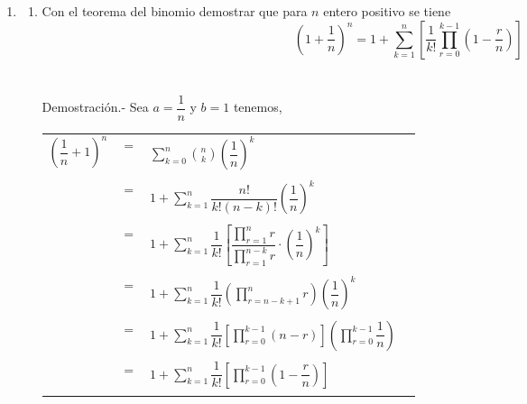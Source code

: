 \begin{enumerate}[ \bfseries 1.]
\item 
\begin{enumerate}[\bfseries (a)]
\item Con el teorema del binomio demostrar que para $n$ entero positivo se tiene 
$$\left( 1 + \dfrac{1}{n}  \right)^n = 1 + \displaystyle\sum_{k=1}^n \left[ \dfrac{1}{k!} \prod_{r=0}^{k-1} \left( 1 - \dfrac{r}{n} \right) \right]$$\\\\
Demostración.- \; Sea $a=\dfrac{1}{n}$ y $b=1$ tenemos,
\begin{center}
\begin{tabular}{rcll}
$\left( \dfrac{1}{n} + 1 \right)^n$&$=$&$\sum\limits_{k=0}^n {n \choose k} \left( \dfrac{1}{n} \right)^k$&\\\\
&$=$&$1 + \sum\limits_{k=1}^n \dfrac{n!}{k!(n-k)!} \left( \dfrac{1}{n} \right)^k$&\\\\
&$=$&$1+ \sum\limits_{k=1}^n \dfrac{1}{k!} \left[ \dfrac{\prod\limits_{r=1}^n r}{\prod\limits_{r=1}^{n-k} r}\cdot \left( \dfrac{1}{n} \right)^k \right]$&\\\\
&$=$&$1 + \sum\limits_{k=1}^n \dfrac{1}{k!} \left( \prod\limits_{r=n-k+1}^n r \right) \left( \dfrac{1}{n} \right) ^k$&\\\\
&$=$&$1 + \sum\limits_{k=1}^n \dfrac{1}{k!} \left[ \prod\limits_{r=0}^{k-1} (n-r) \right] \left( \prod\limits_{r=0}^{k-1} \dfrac{1}{n} \right)$&\\\\
&$=$&$1 + \sum\limits_{k=1}^n \dfrac{1}{k!} \left[ \prod\limits_{r=0}^{k-1} \left( 1 - \dfrac{r}{n} \right) \right] $&\\\\
\end{tabular}
\end{center}


\end{enumerate}
\end{enumerate}
